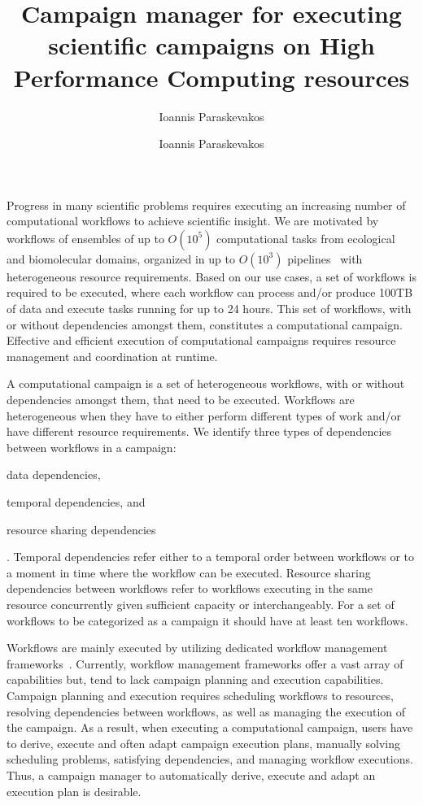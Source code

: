 

\title{Campaign manager for executing scientific campaigns on High Performance 
Computing resources}\author{Ioannis Paraskevakos}
\author{Ioannis Paraskevakos}
\vspace{-8ex}
\date{}


\maketitle

Progress in many scientific problems requires executing an increasing number of 
computational workflows to achieve scientific insight. We are motivated by 
workflows of ensembles of up to $O(10^5)$ computational tasks from ecological 
and biomolecular domains, organized in up to $O(10^3)$ 
pipelines~\cite{rietmann2012forward, dakka2018high, paraskevakos2019workflow} 
with heterogeneous resource requirements. Based on our use cases, a set of 
workflows is required to be executed, where each workflow can process and/or 
produce 100TB of data and execute tasks running for up to 24 hours. This set 
of workflows, with or without dependencies amongst them, constitutes a 
computational campaign. Effective and efficient execution of computational 
campaigns requires resource management and coordination at runtime.

A computational campaign is a set of heterogeneous workflows, with or without 
dependencies amongst them, that need to be executed. Workflows are heterogeneous 
when they have to either perform different types of work and/or have different 
resource requirements. We identify three types of dependencies between workflows 
in a campaign:
\begin{inparaenum}[1)]
\item data dependencies, 
\item temporal dependencies, and 
\item resource sharing dependencies
\end{inparaenum}. 
Temporal dependencies refer either to a temporal order between workflows or to 
a moment in time where the workflow can be executed. Resource sharing 
dependencies between workflows refer to workflows executing in the same resource 
concurrently given sufficient capacity or interchangeably. For a set of 
workflows to be categorized as a campaign it should have at least ten workflows.

Workflows are mainly executed by utilizing dedicated workflow management 
frameworks~\cite{balasubramanian2018harnessing,deelman2015pegasus,ludascher2006scientific,rocklin2015dask,airflow}. 
Currently, workflow management frameworks offer a vast array of capabilities 
but, tend to lack campaign planning and execution capabilities. Campaign planning 
and execution requires scheduling workflows to resources, resolving dependencies 
between workflows, as well as managing the execution of the campaign. As a result, 
when executing a computational campaign, users have to derive, execute and often 
adapt campaign execution plans, manually solving scheduling problems, satisfying 
dependencies, and managing workflow executions. Thus, a campaign manager to 
automatically derive, execute and adapt an execution plan is desirable.

